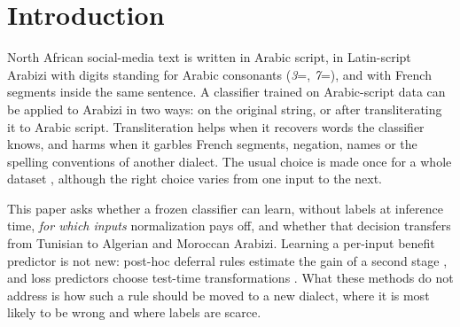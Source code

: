\section{Introduction}
\label{sec:intro}

North African social-media text is written in Arabic script, in Latin-script Arabizi with digits standing for Arabic consonants (\textit{3}=, \textit{7}=), and with French segments inside the same sentence. A classifier trained on Arabic-script data can be applied to Arabizi in two ways: on the original string, or after transliterating it to Arabic script. Transliteration helps when it recovers words the classifier knows, and harms when it garbles French segments, negation, names or the spelling conventions of another dialect. The usual choice is made once for a whole dataset \citep{muller2021unseen,moosa2023transliteration,artetxe2023revisiting}, although the right choice varies from one input to the next.

This paper asks whether a frozen classifier can learn, without labels at inference time, \emph{for which inputs} normalization pays off, and whether that decision transfers from Tunisian to Algerian and Moroccan Arabizi. Learning a per-input benefit predictor is not new: post-hoc deferral rules estimate the gain of a second stage \citep{jitkrittum2023cascade}, and loss predictors choose test-time transformations \citep{kim2020learningloss}. What these methods do not address is how such a rule should be moved to a new dialect, where it is most likely to be wrong and where labels are scarce.

